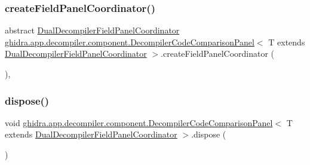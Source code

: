 \subsubsection{\texorpdfstring{createFieldPanelCoordinator()}{createFieldPanelCoordinator()}}
{\footnotesize\ttfamily abstract \mbox{\hyperlink{classghidra_1_1app_1_1decompiler_1_1component_1_1_dual_decompiler_field_panel_coordinator}{Dual\+Decompiler\+Field\+Panel\+Coordinator}} \mbox{\hyperlink{classghidra_1_1app_1_1decompiler_1_1component_1_1_decompiler_code_comparison_panel}{ghidra.\+app.\+decompiler.\+component.\+Decompiler\+Code\+Comparison\+Panel}}$<$ T extends \mbox{\hyperlink{classghidra_1_1app_1_1decompiler_1_1component_1_1_dual_decompiler_field_panel_coordinator}{Dual\+Decompiler\+Field\+Panel\+Coordinator}} $>$.create\+Field\+Panel\+Coordinator (\begin{DoxyParamCaption}{ }\end{DoxyParamCaption})\hspace{0.3cm}{\ttfamily [abstract]}, {\ttfamily [protected]}}

\mbox{\label{classghidra_1_1app_1_1decompiler_1_1component_1_1_decompiler_code_comparison_panel_a67fbfc760cd5649d8b2403133cca5dae}} 
\subsubsection{\texorpdfstring{dispose()}{dispose()}}
{\footnotesize\ttfamily void \mbox{\hyperlink{classghidra_1_1app_1_1decompiler_1_1component_1_1_decompiler_code_comparison_panel}{ghidra.\+app.\+decompiler.\+component.\+Decompiler\+Code\+Comparison\+Panel}}$<$ T extends \mbox{\hyperlink{classghidra_1_1app_1_1decompiler_1_1component_1_1_dual_decompiler_field_panel_coordinator}{Dual\+Decompiler\+Field\+Panel\+Coordinator}} $>$.dispose (\begin{DoxyParamCaption}{ }\end{DoxyParamCaption})\hspace{0.3cm}{\ttfamily [inline]}}



